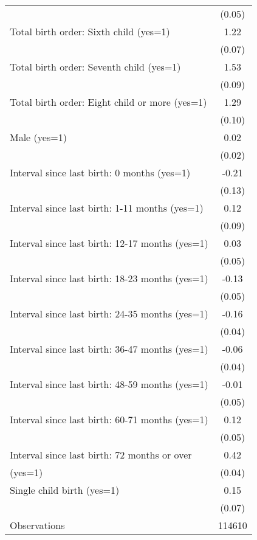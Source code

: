 {\begin{tabular}{l*{1}{c}}
                                                  &      (0.05)\\
Total birth order: Sixth child (yes=1)            &        1.22\\
                                                  &      (0.07)\\
Total birth order: Seventh child (yes=1)          &        1.53\\
                                                  &      (0.09)\\
Total birth order: Eight child or more (yes=1)    &        1.29\\
                                                  &      (0.10)\\
Male (yes=1)                                      &        0.02\\
                                                  &      (0.02)\\
Interval since last birth: 0 months (yes=1)       &       -0.21\\
                                                  &      (0.13)\\
Interval since last birth: 1-11 months (yes=1)    &        0.12\\
                                                  &      (0.09)\\
Interval since last birth: 12-17 months (yes=1)   &        0.03\\
                                                  &      (0.05)\\
Interval since last birth: 18-23 months (yes=1)   &       -0.13\\
                                                  &      (0.05)\\
Interval since last birth: 24-35 months (yes=1)   &       -0.16\\
                                                  &      (0.04)\\
Interval since last birth: 36-47 months (yes=1)   &       -0.06\\
                                                  &      (0.04)\\
Interval since last birth: 48-59 months (yes=1)   &       -0.01\\
                                                  &      (0.05)\\
Interval since last birth: 60-71 months (yes=1)   &        0.12\\
                                                  &      (0.05)\\
Interval since last birth: 72 months or over      &        0.42\\
(yes=1)                                           &      (0.04)\\
Single child birth (yes=1)                        &        0.15\\
                                                  &      (0.07)\\
\hline
Observations                                      &      114610\\
\hline\hline
\end{tabular}
}
